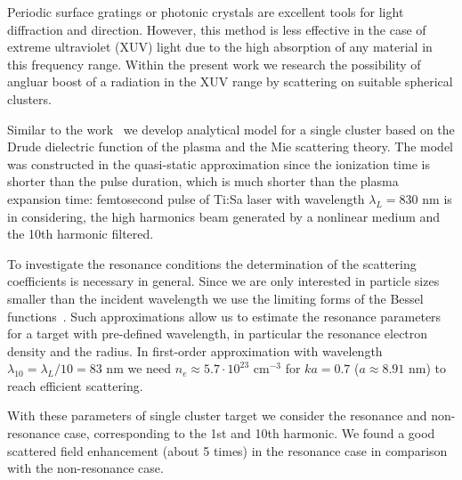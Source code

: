 \documentclass[conference]{IEEEtran}
\begin{document}
Periodic surface gratings or photonic crystals are excellent tools for light diffraction and direction. However, this method is less effective in the case of extreme ultraviolet (XUV) light due to the high absorption of any material in this frequency range. Within the present work we research the possibility of angluar boost of a radiation in the XUV range by scattering on suitable spherical clusters.


Similar to the work~\cite{andreev_lecz} we develop analytical model for a single cluster based on the Drude dielectric function of the plasma and the Mie scattering theory. The model was constructed in the quasi-static approximation since the ionization time is shorter than the pulse duration, which is much shorter than the plasma expansion time: femtosecond pulse of Ti:Sa laser with wavelength $\lambda_{L} = 830$ nm is in considering, the high harmonics beam generated by a nonlinear medium and the 10th harmonic filtered.

To investigate the resonance conditions the determination of the scattering coefficients is necessary in general. Since we are only interested in particle sizes smaller than the incident wavelength we use the limiting forms of the Bessel functions~\cite{boren_huffman}. Such approximations allow us to estimate the resonance parameters for a target with pre-defined wavelength, in particular the resonance electron density and the radius. In first-order approximation with wavelength $\lambda_{10} = \lambda_{L} / 10 = 83$ nm we need $n_e \approx 5.7 \cdot 10^{23}$ $\textrm{cm}^{-3}$ for $ka = 0.7$ ($a \approx 8.91$ nm) to reach efficient scattering.

With these parameters of single cluster target we consider the resonance and non-resonance case, corresponding to the 1st and 10th harmonic. We found a good scattered field enhancement (about 5 times) in the resonance case in comparison with the non-resonance case.


\end{document}
